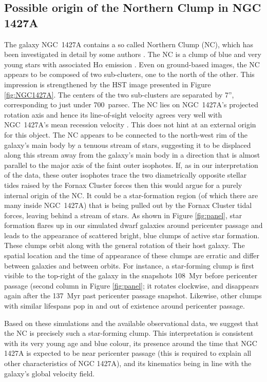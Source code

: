 \subsection{Possible origin of the Northern Clump in NGC 1427A} \label{NC1427A}
The galaxy NGC~1427A contains a so called Northern Clump (NC), which has been investigated in detail by some authors \citep{Cellone1997, Hilker1997}.
The NC is a clump of blue and very young stars with associated H$\alpha$ emission \citep{Sivanandam2014}. Even on ground-based images, the NC appears to be composed of two sub-clusters, one to the north of the other. This impression is strengthened by the HST image presented in Figure \ref{fig:NGC1427A}. The centers of the two sub-clusters are separated by 7'', corresponding to just under 700~parsec. The NC lies on NGC~1427A's projected rotation axis and hence its line-of-sight velocity agrees very well with NGC~1427A's mean recession velocity \citep{Bureau1996,Chaname2000}. This does not hint at an external origin for this object. The NC appears to be connected to the north-west rim of the galaxy's main body by a tenuous stream of stars, suggesting it to be displaced along this stream away from the galaxy's main body in a direction that is almost parallel to the major axis of the faint outer isophotes. If, as in our interpretation of the data, these outer isophotes trace the two diametrically opposite stellar tides raised by the Fornax Cluster forces then this would argue for a purely internal origin of the NC. It could be a star-formation region (of which there are many inside NGC~1427A) that is being pulled out by the Fornax Cluster tidal forces, leaving behind a stream of stars.
As shown in Figure \ref{fig:panel}, star formation flares up in our simulated dwarf galaxies around pericenter passage and leads to the appearance of scattered bright, blue clumps of active star formation. These clumps orbit along with the general rotation of their host galaxy. The spatial location and the time of appearance of these clumps are erratic and differ between galaxies and between orbits.
For instance, a star-forming clump is first visible to the top-right of the galaxy in the snapshots 108~Myr before pericenter passage (second column in Figure \ref{fig:panel}; it rotates clockwise, and disappears again after the 137~Myr past pericenter passage snapshot. Likewise, other clumps with similar lifespans pop in and out of existence around pericenter passage.

Based on these simulations and the available observational data, we suggest that the NC is precisely such a star-forming clump. This interpretation is consistent with its very young age and blue colour, its presence around the time that NGC 1427A is expected to be near pericenter passage (this is required to explain all other characteristics of NGC 1427A), and its kinematics being in line with the galaxy's global velocity field.

